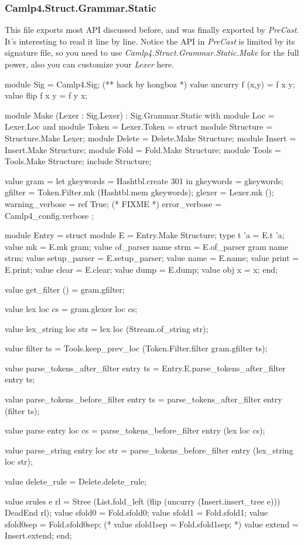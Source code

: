 \subsubsection{Camlp4.Struct.Grammar.Static}
\label{Camlp4.Struct.Grammar.Static}
This file exports most API discussed before, and was finally exported
by \textit{PreCast}. It's interesting to read it line by line. Notice
the API in \textit{PreCast} is limited by its signature file, so you
need to use \textit{Camlp4.Struct.Grammar.Static.Make} for the full
power, also you can customize your \textit{Lexer} here.

\begin{ocamlcode}
module Sig = Camlp4.Sig; (** hack by hongboz *)
value uncurry f (x,y) = f x y;
value flip f x y = f y x;

module Make (Lexer : Sig.Lexer)
: Sig.Grammar.Static with module Loc = Lexer.Loc
                        and module Token = Lexer.Token
= struct
  module Structure = Structure.Make Lexer;
  module Delete = Delete.Make Structure;
  module Insert = Insert.Make Structure;
  module Fold = Fold.Make Structure;
  module Tools = Tools.Make Structure;
  include Structure;

  value gram =
    let gkeywords = Hashtbl.create 301 in
    {
      gkeywords = gkeywords;
      gfilter = Token.Filter.mk (Hashtbl.mem gkeywords);
      glexer = Lexer.mk ();
      warning_verbose = ref True; (* FIXME *)
      error_verbose = Camlp4_config.verbose
    };

  module Entry = struct
    module E = Entry.Make Structure;
    type t 'a = E.t 'a;
    value mk = E.mk gram;
    value of_parser name strm = E.of_parser gram name strm;
    value setup_parser = E.setup_parser;
    value name = E.name;
    value print = E.print;
    value clear = E.clear;
    value dump = E.dump;
    value obj x = x;
  end;

  value get_filter () = gram.gfilter;

  value lex loc cs = gram.glexer loc cs;

  value lex_string loc str = lex loc (Stream.of_string str);

  value filter ts = Tools.keep_prev_loc (Token.Filter.filter gram.gfilter ts);

  value parse_tokens_after_filter entry ts = Entry.E.parse_tokens_after_filter entry ts;

  value parse_tokens_before_filter entry ts = parse_tokens_after_filter entry (filter ts);

  value parse entry loc cs = parse_tokens_before_filter entry (lex loc cs);

  value parse_string entry loc str = parse_tokens_before_filter entry (lex_string loc str);

  value delete_rule = Delete.delete_rule;

  value srules e rl =
    Stree (List.fold_left (flip (uncurry (Insert.insert_tree e))) DeadEnd rl);
  value sfold0 = Fold.sfold0;
  value sfold1 = Fold.sfold1;
  value sfold0sep = Fold.sfold0sep;
  (* value sfold1sep = Fold.sfold1sep; *)
  value extend = Insert.extend;
end;
\end{ocamlcode}


